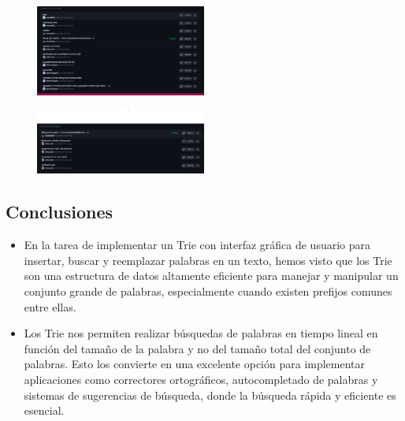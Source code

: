 \documentclass{article}
\begin{document}
\begin{itemize}
\begin{figure}[H]
		\end{figure}
		\begin{figure}[H]
		\centering
		\includegraphics[width=0.5\textwidth, height=0.5\textwidth,keepaspectratio]{pruebas/commits4.png}
		\end{figure}
		\begin{figure}[H]
		\centering
		\includegraphics[width=0.5\textwidth, height=0.5\textwidth,keepaspectratio]{pruebas/commits5.png}
		\end{figure}
	\end{itemize}
	\subsection{Conclusiones}
	\begin{itemize}
		\item En la tarea de implementar un Trie con interfaz gráfica de usuario para insertar, buscar y reemplazar palabras en un texto, hemos visto que los Trie son una estructura de datos altamente eficiente para manejar y manipular un conjunto grande de palabras, especialmente cuando existen prefijos comunes entre ellas.

		\item Los Trie nos permiten realizar búsquedas de palabras en tiempo lineal en función del tamaño de la palabra y no del tamaño total del conjunto de palabras. Esto los convierte en una excelente opción para implementar aplicaciones como correctores ortográficos, autocompletado de palabras y sistemas de sugerencias de búsqueda, donde la búsqueda rápida y eficiente es esencial.
	\end{itemize}
\end{document}
